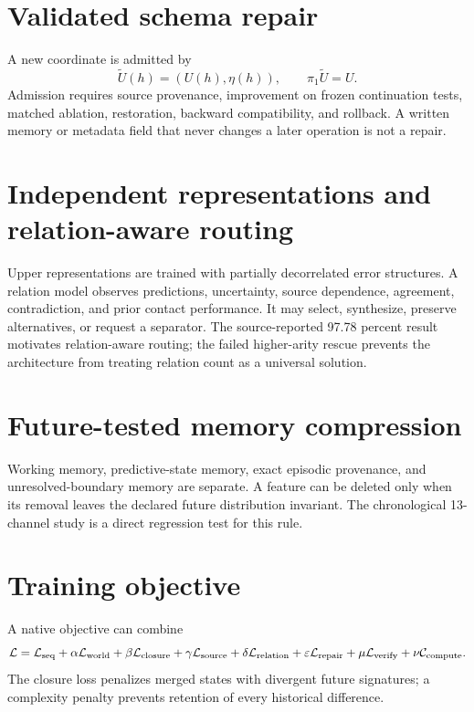 \documentclass[11pt,a4paper]{article}
\begin{document}
\section{Validated schema repair}
A new coordinate is admitted by
\begin{equation}
\widetilde U(h)=(U(h),\eta(h)),\qquad\pi_1\widetilde U=U.
\end{equation}
Admission requires source provenance, improvement on frozen continuation tests, matched ablation, restoration, backward compatibility, and rollback. A written memory or metadata field that never changes a later operation is not a repair.

\section{Independent representations and relation-aware routing}
Upper representations are trained with partially decorrelated error structures. A relation model observes predictions, uncertainty, source dependence, agreement, contradiction, and prior contact performance. It may select, synthesize, preserve alternatives, or request a separator. The source-reported 97.78 percent result motivates relation-aware routing; the failed higher-arity rescue prevents the architecture from treating relation count as a universal solution.

\section{Future-tested memory compression}
Working memory, predictive-state memory, exact episodic provenance, and unresolved-boundary memory are separate. A feature can be deleted only when its removal leaves the declared future distribution invariant. The chronological 13-channel study is a direct regression test for this rule.

\section{Training objective}
A native objective can combine
\begin{equation}
\mathcal L=\mathcal L_{\rm seq}+\alpha\mathcal L_{\rm world}+\beta\mathcal L_{\rm closure}
+\gamma\mathcal L_{\rm source}+\delta\mathcal L_{\rm relation}
+\varepsilon\mathcal L_{\rm repair}+\mu\mathcal L_{\rm verify}+\nu\mathcal C_{\rm compute}.
\end{equation}
The closure loss penalizes merged states with divergent future signatures; a complexity penalty prevents retention of every historical difference.
\end{document}
